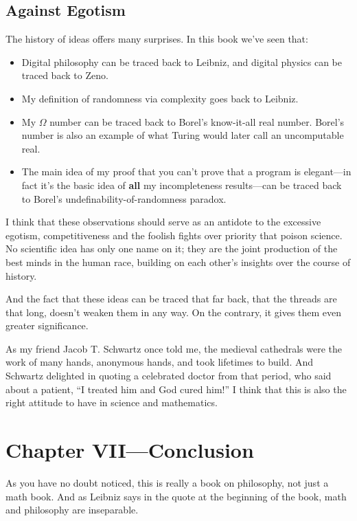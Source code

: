 \documentclass[12pt]{book}
\begin{document}
\section*{Against Egotism}
     
The history of ideas offers many surprises.
In this book we've seen that:
\begin{itemize}
\item
Digital philosophy can be traced back to Leibniz,
and digital physics can be traced back to Zeno. 
\item
My definition of randomness via complexity goes back to Leibniz.
\item
My $\Omega$ number can be traced back to Borel's know-it-all real number.
Borel's number is also an example of what Turing would later call an uncomputable real.
\item
The main idea of my proof that you can't prove that a program
is elegant---in fact it's the basic idea of \textbf{all} my incompleteness results---can 
be traced back to Borel's undefinability-of-randomness paradox.
\end{itemize}
I think that these observations should serve as an antidote to the excessive
egotism, competitiveness and the foolish fights over priority that poison science.
No scientific idea has only one name on it; they are the joint production
of the best minds in the human race, building on each other's insights
over the course of history.
 
And the fact that these ideas can be traced that far back, 
that the threads are that long, doesn't weaken them in any way. 
On the contrary, it gives them even greater significance.
 
As my friend Jacob T. Schwartz once told me, the medieval cathedrals
were the work of many hands, anonymous hands, and took lifetimes to build.
And Schwartz delighted in quoting a celebrated doctor from that period, who said about a patient,
``I treated him and God cured him!''  I think that this is also the right attitude to have
in science and mathematics.

\chapter*{Chapter VII---Conclusion}

As you have no doubt noticed, this is really a book on philosophy, not just a
math book.
And as Leibniz says in the quote at the beginning of the book, 
math and philosophy are inseparable.
 
\end{document}
